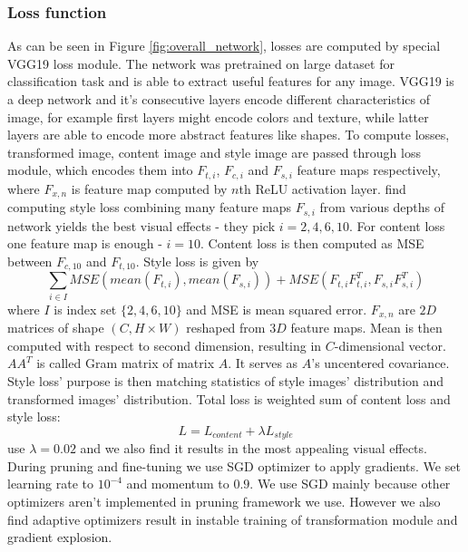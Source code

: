 \documentclass[../Main.tex]{subfiles}
\begin{document}
    \subsubsection{Loss function}
    As can be seen in Figure \ref{fig:overall_network}, losses are computed by
    special VGG19 loss module. The network was pretrained on large dataset for classification
    task and is able to extract useful features for any image. 
    VGG19 is a deep network and it's consecutive
    layers encode different characteristics of image, for example first layers might
    encode colors and texture, while latter layers are able to encode more abstract features like shapes.
    To compute losses, transformed image, content image and
    style image are passed through loss module, which encodes them into $F_{t,i}$, $F_{c,i}$ and 
    $F_{s,i}$ feature maps respectively, where $F_{x,n}$ is feature map computed by $n$th
    ReLU activation layer. \cite{Li2018} find computing style loss combining many 
    feature maps $F_{s,i}$ from various depths of network yields the best visual effects - they pick $i=2,4,6,10$. For 
    content loss one feature map is enough - $i=10$. Content loss is then computed as 
    MSE between $F_{c,10}$ and $F_{t,10}$. Style loss is given by
    \[ \sum\limits_{i \in I} MSE(mean(F_{t,i}), mean(F_{s,i})) + MSE(F_{t,i}F_{t,i}^T, F_{s,i}F_{s,i}^T) \]
    where $I$ is index set $\{2,4,6,10\}$ and MSE is mean squared error. $F_{x,n}$ are $2D$ matrices
    of shape $\left(C, H \times W\right)$ reshaped from $3D$ feature maps. Mean is then computed with respect
    to second dimension, resulting in $C$-dimensional vector. 
    $AA^T$ is called Gram matrix of matrix $A$. It serves as $A$'s uncentered covariance.
    Style loss' purpose is then matching statistics of
    style images' distribution and transformed images' distribution.
    Total loss is weighted sum of content loss and style loss:
    \[L=L_{content} + \lambda L_{style}\] \cite{Li2018} use $\lambda=0.02$ and we 
    also find it results in the most appealing visual effects. During pruning and 
    fine-tuning we use SGD optimizer to apply gradients. We set learning rate to $10^{-4}$
    and momentum to $0.9$. We use SGD mainly because other optimizers aren't implemented 
    in pruning framework we use. However we also find adaptive optimizers result 
    in instable training of transformation module and gradient explosion.
    
\end{document}
